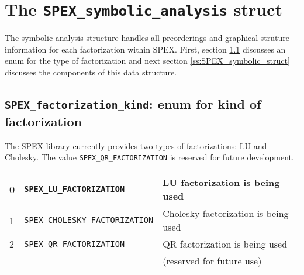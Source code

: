 \documentclass[12pt]{report}
\theoremstyle{definition}
\begin{document}
\section{The \texttt{SPEX\_symbolic\_analysis} struct} \label{s:spex_symbolic_analysis}

The symbolic analysis structure handles all preorderings and graphical struture information for each factorization within SPEX. First, section \ref{ss:spex_factorization_kind} discusses an enum for the type of factorization and next section \ref{ss:SPEX_symbolic_struct} discusses the components of this data structure.

\subsection{\texttt{SPEX\_factorization\_kind}: enum for kind of factorization}
\label{ss:spex_factorization_kind}

The SPEX library currently provides two types of factorizations: LU and Cholesky. The value
\verb|SPEX_QR_FACTORIZATION| is reserved for future development.

{\small
\begin{center}
\begin{tabular}{lll}
\hline
0 & \verb|SPEX_LU_FACTORIZATION|     & LU factorization is being used \\
\hline
1 & \verb|SPEX_CHOLESKY_FACTORIZATION|  & Cholesky factorization is being used\\
\hline
2 & \verb|SPEX_QR_FACTORIZATION|    & QR factorization is being used \\
                                    && (reserved for future use)\\
\hline
\end{tabular}
\label{tab:SPEX_factorizationkind}
\end{center}
}

\end{document}
